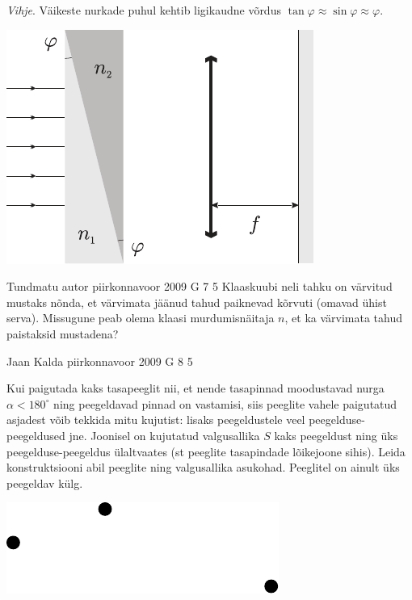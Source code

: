 \documentclass[11pt]{article}
\begin{document}
{{\emph{Vihje}. Väikeste nurkade puhul kehtib ligikaudne võrdus $\tan \varphi \approx \sin \varphi \approx \varphi $.

\begin{center}
	\includegraphics[width=0.6\linewidth]{2006-lahg-06-yl}
\end{center}
\fi
}

{Tundmatu autor} %
{piirkonnavoor} %
{2009} %
{G 7} %
{5} %
{
\ifStatement
Klaaskuubi neli tahku on värvitud mustaks nõnda,
et värvimata jäänud tahud paiknevad kõrvuti (omavad ühist serva). Missugune peab olema klaasi murdumisnäitaja $n$, et ka värvimata tahud
paistaksid mustadena?
\fi
}

{Jaan Kalda} %
{piirkonnavoor} %
{2009} %
{G 8} %
{5} %
{
\ifStatement
Kui paigutada kaks tasapeeglit nii, et nende tasapinnad moodustavad nurga $\alpha<180^\circ$ ning peegeldavad pinnad on vastamisi, siis peeglite vahele paigutatud asjadest võib tekkida mitu kujutist: lisaks peegeldustele veel peegelduse-peegeldused jne. Joonisel on kujutatud valgusallika $S$ kaks peegeldust ning üks peegelduse-peegeldus ülaltvaates (st peeglite tasapindade lõikejoone sihis). Leida konstruktsiooni abil peeglite ning valgusallika asukohad. Peeglitel on ainult üks peegeldav külg.\\

\begin{center}
	\includegraphics[width=0.6\linewidth]{2009-v2g-08-yl}
\end{center}
\fi
}

}
\end{document}
